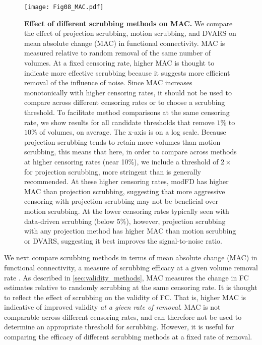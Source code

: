 \documentclass{article}
\begin{document}
\begin{figure}
    \centering
    \texttt{[image: Fig08\_MAC.pdf]}
    \caption{\small 
    \textbf{Effect of different scrubbing methods on MAC.} We compare the effect of projection scrubbing, motion scrubbing, and DVARS on mean absolute change (MAC) in functional connectivity. MAC is measured relative to random removal of the same number of volumes. At a fixed censoring rate, higher MAC is thought to indicate more effective scrubbing because it suggests more efficient removal of the influence of noise. Since MAC increases monotonically with higher censoring rates, it should not be used to compare across different censoring rates or to choose a scrubbing threshold. To facilitate method comparisons at the same censoring rate, we show results for all candidate thresholds that remove $1\%$ to $10\%$ of volumes, on average. The x-axis is on a log scale. Because projection scrubbing tends to retain more volumes than motion scrubbing, this means that here, in order to compare across methods at higher censoring rates (near 10\%), we include a threshold of $2\times$ for projection scrubbing, more stringent than is generally recommended. At these higher censoring rates, modFD has higher MAC than projection scrubbing, suggesting that more aggressive censoring with projection scrubbing may not be beneficial over motion scrubbing. At the lower censoring rates typically seen with data-driven scrubbing (below $5\%$), however, projection scrubbing with any projection method has higher MAC than motion scrubbing or DVARS, suggesting it best improves the signal-to-noise ratio.}
    \label{fig:MAC}
\end{figure}


We next compare scrubbing methods in terms of mean absolute change (MAC) in functional connectivity, a measure of scrubbing efficacy at a given volume removal rate \citep{williams2022advancing}. As described in \autoref{sec:validity_methods}, MAC measures the change in FC estimates relative to randomly scrubbing at the same censoring rate. It is thought to reflect the effect of scrubbing on the validity of FC. That is, higher MAC is indicative of improved validity \textit{at a given rate of removal}. MAC is not comparable across different censoring rates, and can therefore not be used to determine an appropriate threshold for scrubbing. However, it is useful for comparing the efficacy of different scrubbing methods at a fixed rate of removal. 
\end{document}
